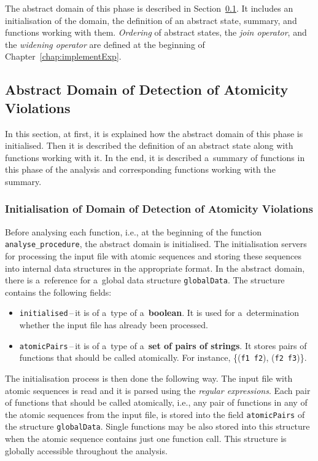 The abstract domain of this phase is described in
Section~\ref{sec:implementPhase2Domain}. It includes an initialisation
of the domain, the definition of an abstract state, summary, and functions
working with them. \emph{Ordering} of abstract states, the \emph{join
operator}, and the \emph{widening operator} are defined at the beginning of
Chapter~\ref{chap:implementExp}.


\subsection{Abstract Domain of Detection of Atomicity Violations}
\label{sec:implementPhase2Domain}

In this section, at first, it is explained how the abstract domain of this
phase is initialised. Then it is described the definition of an abstract
state along with functions working with it. In the end, it is described
a~summary of functions in this phase of the analysis and corresponding
functions working with the summary.

\subsubsection{Initialisation of Domain of Detection of Atomicity Violations}

Before analysing each function, i.e., at the beginning of the function
\texttt{analyse\_procedure}, the abstract domain is initialised. The
initialisation servers for processing the input file with atomic sequences
and storing these sequences into internal data structures in the
appropriate format. In the abstract domain, there is a~reference for
a~global data structure \texttt{globalData}. The structure contains the
following fields:
\begin{itemize}
    \item
        \texttt{initialised}\,--\,it is of a~type of a~\textbf{boolean}. It
        is used for a~determination whether the input file has already been
        processed.

    \item
        \texttt{atomicPairs}\,--\,it is of a~type of a~\textbf{set of pairs
        of strings}. It stores pairs of functions that should be called
        atomically. For instance, \{(\texttt{f1}~\texttt{f2}),
        (\texttt{f2}~\texttt{f3})\}.
\end{itemize}

The initialisation process is then done the following way. The input file
with atomic sequences is read and it is parsed using the \emph{regular
expressions}. Each pair of functions that should be called atomically,
i.e., any pair of functions in any of the atomic sequences from the input
file, is stored into the field \texttt{atomicPairs} of the structure
\texttt{globalData}. Single functions may be also stored into this
structure when the atomic sequence contains just one function call.
This structure is globally accessible throughout the analysis.

